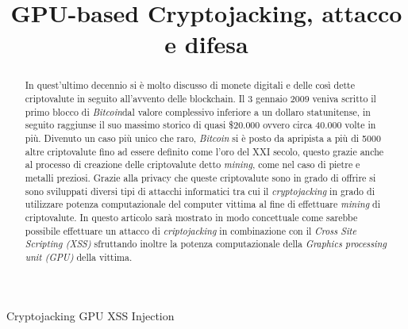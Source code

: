 \documentclass[conference, italian]{IEEEtran}
\begin{document}
\title{GPU-based Cryptojacking, attacco e difesa
}

\author{
\and
{}
}

\maketitle

\begin{abstract}
In quest'ultimo decennio si è molto discusso di monete digitali e delle così dette criptovalute in seguito all'avvento delle blockchain. Il 3 gennaio 2009 veniva scritto il primo blocco di \emph{Bitcoin}dal valore complessivo inferiore a un dollaro statunitense, in seguito raggiunse il suo massimo storico di quasi \$20.000 ovvero circa 40.000 volte in più. Divenuto un caso più unico che raro, \emph{Bitcoin} si è posto da apripista a più di 5000 altre criptovalute fino ad essere definito come l'oro del \RN{21} secolo, questo grazie anche al processo di creazione delle criptovalute detto \emph{mining}, come nel caso di pietre e metalli preziosi. Grazie alla privacy che queste criptovalute sono in grado di offrire si sono sviluppati diversi tipi di attacchi informatici tra cui il \emph{cryptojacking} in grado di utilizzare potenza computazionale del computer vittima al fine di effettuare \emph{mining} di criptovalute. In questo articolo sarà mostrato in modo concettuale come sarebbe possibile effettuare un attacco di \emph{criptojacking} in combinazione con il \emph{Cross Site Scripting (XSS)} sfruttando inoltre la potenza computazionale della \emph{Graphics processing unit (GPU)} della vittima. \\
\end{abstract}

\begin{IEEEkeywords}
Cryptojacking GPU XSS Injection
\end{IEEEkeywords}
\end{document}
